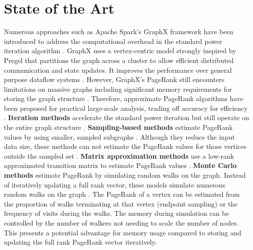\documentclass[a4paper,12pt]{article}
\begin{document}
\section{State of the Art}
Numerous approaches such as Apache Spark's GraphX framework \cite{xin_graphx_2013} have been introduced to address the computational overhead in the standard power iteration algorithm  \cite{page_pagerank_1999}.
GraphX uses a vertex-centric model strongly inspired by Pregel \cite{malewicz_pregel_2010} that partitions the graph across a cluster to allow efficient distributed communication and state updates. It improves the  performance over general purpose dataflow systems \cite{jin_software_2022}. However, GraphX's PageRank still encounters limitations on massive graphs including significant memory requirements for storing the graph structure \cite{wu_efficient_2024}\cite{xin_graphx_2014}. Therefore, approximate PageRank algorithms have been proposed for practical large-scale analysis, trading off accuracy for efficiency \cite{wu_efficient_2024}. 
\textbf{Iteration methods} \cite{xie_parameterized_2023}\cite{anikin_efficient_2022} accelerate the standard power iteration but still operate on the entire graph structure \cite{wu_efficient_2024}. 
\textbf{Sampling-based methods} estimate PageRank values by using smaller, sampled subgraphs \cite{bar-yossef_local_2008}\cite{chen_local_2004}. Although they reduce the input data size, these methods can not estimate the PageRank values for those vertices outside the sampled set \cite{wu_efficient_2024}.
\textbf{Matrix approximation methods} use a low-rank approximated transition matrix to estimate PageRank values \cite{liu_fast_2015}\cite{benczur_feasibility_2005}. 
\textbf{Monte Carlo methods} estimate PageRank by simulating random walks on the graph. Instead of iteratively updating a full rank vector, these models simulate numerous random walks on the graph \cite{avrachenkov_monte_2007}. The PageRank of a vertex can be estimated from the proportion of walks terminating at that vertex (endpoint sampling) or the frequency of visits during the walks. The memory during simulation can be controlled by the number of walkers not needing to scale the number of nodes. This presents a potential advantage for memory usage compared to storing and updating the full rank PageRank vector iteratively. 
\end{document}

